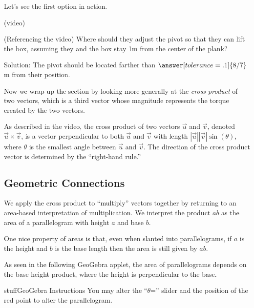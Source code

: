 \documentclass{ximera}
\begin{document}
Let's see the first option in action.

(video)

\begin{problem}
    (Referencing the video) Where should they adjust the pivot so that they can lift the box, assuming they and the box stay 1m from the center of the plank?

    Solution: The pivot should be located farther than $\answer[tolerance=.1]{8/7}$ m from their position.
\end{problem}

Now we wrap up the section by looking more generally at the \emph{cross product} of two vectors, which is a third vector whose magnitude represents the torque created by the two vectors.

\begin{center}
\end{center}

\begin{definition}
    As described in the video, the cross product of two vectors $\vec{u}$ and $\vec{v}$, denoted $\vec{u}\times \vec{v}$, is a vector perpendicular to both $\vec{u}$ and $\vec{v}$ with length $|\vec{u}||\vec{v}|\sin(\theta)$, where $\theta$ is the smallest angle between $\vec{u}$ and $\vec{v}$. The direction of the cross product vector is determined by the ``right-hand rule.''
\end{definition}

\subsection*{Geometric Connections}
We apply the cross product to ``multiply'' vectors together by returning to an area-based interpretation of multiplication. We interpret the product $ab$ as the area of a parallelogram with height $a$ and base $b$. 

One nice property of areas is that, even when slanted into parallelograms, if $a$ is the height and $b$ is the base length then the area is still given by $ab$.

As seen in the following GeoGebra applet, the area of parallelograms depends on the base height product, where the height is perpendicular to the base. 

\begin{expandable}{stuff}{GeoGebra Instructions}
    You may alter the ``$\theta$='' slider and the position of the red point to alter the parallelogram.
\end{expandable}
\end{document}

